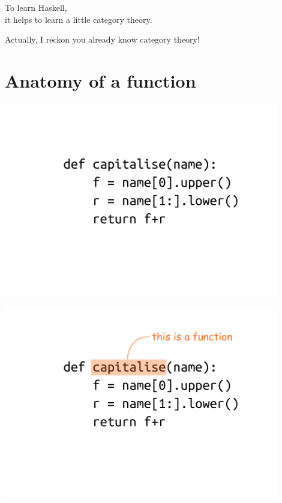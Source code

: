 \documentclass[xcolor={table}]{beamer}
\begin{document}
\begin{frame}{}{}

    \centering
    {\Large To learn Haskell, \\it helps to learn a little category theory. }
    \par\bigskip\pause

    Actually, I reckon you already know category theory!


\end{frame}

\section{Anatomy of a function}

\begin{frame}{}{}

    \centering
    \includegraphics[width=0.9\textwidth]{images/python-code-01.png}

\end{frame}

\begin{frame}{}{}

    \centering
    \includegraphics[width=0.9\textwidth]{images/python-code-02.png}

\end{frame}
\end{document}

